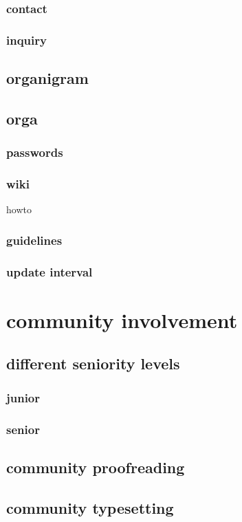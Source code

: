 \documentclass[output=guidelines,guidelines] {langscibook}
\begin{document}
\subsubsection{contact}
\subsubsection{inquiry}
\subsection{organigram}
\subsection{orga}
\subsubsection{passwords}
\subsubsection{wiki}
                    howto
\subsubsection{guidelines}
\subsubsection{update interval}
\section{community involvement}
\subsection{different seniority levels}
\subsubsection{junior}
\subsubsection{senior}
\subsection{community proofreading}
\subsection{community typesetting}
\end{document}
